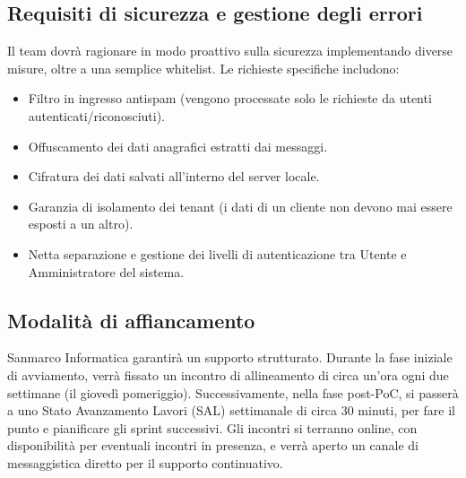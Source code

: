 \documentclass[verbale=esterno]{gpt}
\begin{document}
\subsection{Requisiti di sicurezza e gestione degli errori}
Il team dovrà ragionare in modo proattivo sulla sicurezza implementando diverse misure, oltre a una semplice whitelist. Le richieste specifiche includono:
\begin{itemize}
    \item Filtro in ingresso antispam (vengono processate solo le richieste da utenti autenticati/riconosciuti).
    \item Offuscamento dei dati anagrafici estratti dai messaggi.
    \item Cifratura dei dati salvati all'interno del server locale.
    \item Garanzia di isolamento dei tenant (i dati di un cliente non devono mai essere esposti a un altro).
    \item Netta separazione e gestione dei livelli di autenticazione tra Utente e Amministratore del sistema.
\end{itemize}

\subsection{Modalità di affiancamento}
Sanmarco Informatica garantirà un supporto strutturato. Durante la fase iniziale di avviamento, verrà fissato un incontro di allineamento di circa un'ora ogni due settimane (il giovedì pomeriggio). Successivamente, nella fase post-PoC, si passerà a uno Stato Avanzamento Lavori (SAL) settimanale di circa 30 minuti, per fare il punto e pianificare gli sprint successivi. Gli incontri si terranno online, con disponibilità per eventuali incontri in presenza, e verrà aperto un canale di messaggistica diretto per il supporto continuativo.  



\end{document}
